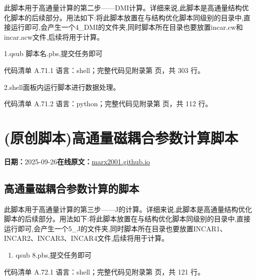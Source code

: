 \documentclass[lang=cn,scheme=chinese,color=blue,device=normal,toc=onecol,math=cm]{elegantbook}
\begin{document}
此脚本用于高通量计算的第二步——DMI计算。详细来说,此脚本是高通量结构优化脚本的后续部分。用法如下:将此脚本放置在与结构优化脚本同级别的目录中,直接运行即可,会产生一个4\_\allowbreak{}DMI的文件夹,同时脚本所在目录也要放置incar.cw和incar.acw文件,后续将用于计算。\par


1.qsub 脚本名.pbs,提交任务即可\par


\begin{codeindexbox}{代码清单 A.71.1}
语言：shell；完整代码见附录第 \pageref{code:71:1} 页，共 303 行。
\end{codeindexbox}


2.shell面板内运行脚本进行数据处理。\par


\begin{codeindexbox}{代码清单 A.71.2}
语言：python；完整代码见附录第 \pageref{code:71:2} 页，共 112 行。
\end{codeindexbox}



\section{(原创脚本)高通量磁耦合参数计算脚本}
\begin{articlemeta}
\textbf{日期：}2025-09-26\hfill\textbf{在线原文：}\href{https://marx2001.github.io/sci-note\_posts/20250926-scripts/}{marx2001.github.io}
\end{articlemeta}

\subsection{高通量磁耦合参数计算的脚本}


此脚本用于高通量计算的第三步——J的计算。详细来说,此脚本是高通量结构优化脚本的后续部分。用法如下:将此脚本放置在与结构优化脚本同级别的目录中,直接运行即可,会产生一个5\_\allowbreak{}J的文件夹,同时脚本所在目录也要放置INCAR1、INCAR2、INCAR3、INCAR4文件,后续将用于计算。\par


\begin{enumerate}
\item qsub 8.pbs,提交任务即可
\end{enumerate}


\begin{codeindexbox}{代码清单 A.72.1}
语言：shell；完整代码见附录第 \pageref{code:72:1} 页，共 121 行。
\end{codeindexbox}
\end{document}
